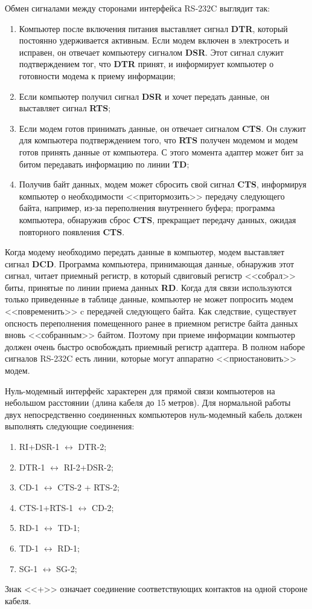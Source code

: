 \documentclass[russian,utf8,simple,emptystyle]{eskdtext}
\begin{document}
Обмен сигналами между сторонами интерфейса RS-232C выглядит так:
\begin{enumerate}
\item Компьютер после включения питания выставляет сигнал \textbf{DTR}, который постоянно удерживается активным. Если модем включен в электросеть и исправен, он отвечает компьютеру сигналом \textbf{DSR}. Этот сигнал служит подтверждением тог, что \textbf{DTR} принят, и информирует компьютер о готовности модема к приему информации;
\item Если компьютер получил сигнал \textbf{DSR} и хочет передать данные, он выставляет сигнал \textbf{RTS};
\item Если модем готов принимать данные, он отвечает сигналом \textbf{CTS}. Он служит для компьютера подтверждением того, что \textbf{RTS} получен модемом и модем готов принять данные от компьютера. С этого момента адаптер может бит за битом передавать информацию по линии \textbf{TD};
\item Получив байт данных, модем может сбросить свой сигнал \textbf{CTS}, информируя компьютер о необходимости <<притормозить>> передачу следующего байта, например, из-за переполнения внутреннего буфера; программа компьютера, обнаружив сброс \textbf{CTS}, прекращает передачу данных, ожидая повторного появления \textbf{CTS}.
\end{enumerate}

Когда модему необходимо передать данные в компьютер, модем выставляет сигнал  \textbf{DCD}. Программа компьютера, принимающая данные, обнаружив этот сигнал, читает приемный регистр, в который сдвиговый регистр <<собрал>> биты, принятые по линии приема данных \textbf{RD}. Когда для связи используются только приведенные в таблице данные, компьютер не может попросить модем <<повременить>> c передачей следующего байта. Как следствие, существует опсность переполнения помещенного ранее в приемном регистре байта данных вновь <<собранным>> байтом. Поэтому при приеме информации компьютер должен очень быстро освобождать приемный регистр адаптера. В полном наборе сигналов RS-232C есть линии, которые могут аппаратно <<приостановить>> модем.

Нуль-модемный интерфейс характерен для прямой связи компьютеров на небольшом расстоянии (длина кабеля до 15 метров). Для нормальной работы двух непосредственно соединенных компьютеров нуль-модемный кабель должен выполнять следующие соединения:
\begin{enumerate}
\item RI+DSR-1 $\leftrightarrow$ DTR-2;
\item DTR-1 $\leftrightarrow$ RI-2+DSR-2;
\item CD-1 $\leftrightarrow$ CTS-2 + RTS-2;
\item CTS-1+RTS-1 $\leftrightarrow$ CD-2;
\item RD-1 $\leftrightarrow$ TD-1;
\item TD-1 $\leftrightarrow$ RD-1;
\item SG-1 $\leftrightarrow$ SG-2;
\end{enumerate}
Знак <<+>> означает соединение соответствующих контактов на одной стороне кабеля.
\end{document}
